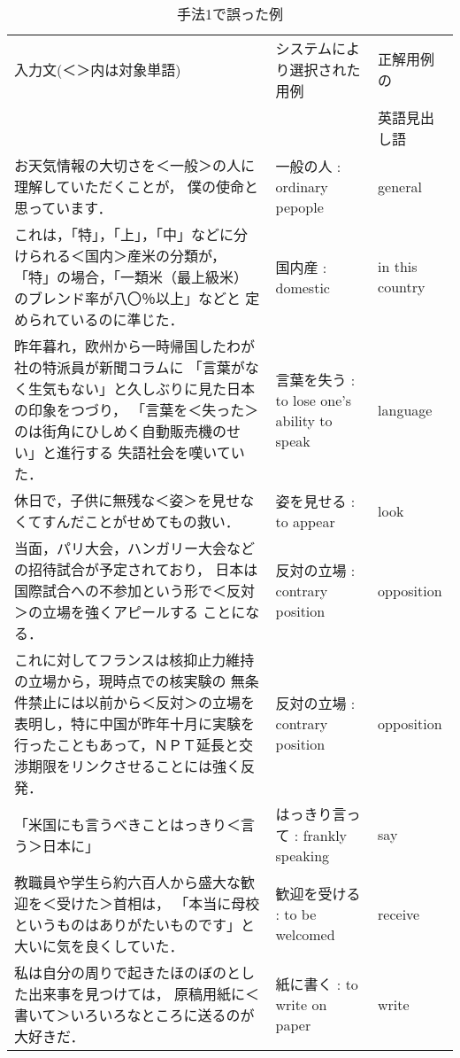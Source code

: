 \begin{table*}[htbp]
  \footnotesize
  \begin{center}
    \caption{手法1で誤った例}
    \label{tab:error1}
    \begin{tabular}[c]{|p{4.5cm}|l|l|}
      \hline
      入力文(＜＞内は対象単語) & システムにより選択された用例 & 正解用例の \\
      & & 英語見出し語 \\
      \hline
      お天気情報の大切さを＜一般＞の人に理解していただくことが，
      僕の使命と思っています． 
      & 一般の人 : ordinary pepople & general \\
      \hline
      これは，「特」，「上」，「中」などに分けられる＜国内＞産米の分類が，
      「特」の場合，「一類米（最上級米）のブレンド率が八〇％以上」などと
      定められているのに準じた．
      & 国内産 : domestic & in this country\\
      \hline
      昨年暮れ，欧州から一時帰国したわが社の特派員が新聞コラムに
      「言葉がなく生気もない」と久しぶりに見た日本の印象をつづり，
      「言葉を＜失った＞のは街角にひしめく自動販売機のせい」と進行する
      失語社会を嘆いていた．
      & 言葉を失う : to lose one's ability to speak & language \\
      \hline
      休日で，子供に無残な＜姿＞を見せなくてすんだことがせめてもの救い．
      & 姿を見せる : to appear & look \\
      \hline
      当面，パリ大会，ハンガリー大会などの招待試合が予定されており，
      日本は国際試合への不参加という形で＜反対＞の立場を強くアピールする
      ことになる．
      & 反対の立場 : contrary position & opposition \\
      \hline
      これに対してフランスは核抑止力維持の立場から，現時点での核実験の
      無条件禁止には以前から＜反対＞の立場を表明し，特に中国が昨年十月に実験を
      行ったこともあって，ＮＰＴ延長と交渉期限をリンクさせることには強く反発．
      & 反対の立場 : contrary position & opposition \\
      \hline
      「米国にも言うべきことはっきり＜言う＞日本に」
      & はっきり言って : frankly speaking & say \\
      \hline
      教職員や学生ら約六百人から盛大な歓迎を＜受けた＞首相は，
      「本当に母校というものはありがたいものです」と大いに気を良くしていた．
      & 歓迎を受ける : to be welcomed & receive \\
      \hline
      私は自分の周りで起きたほのぼのとした出来事を見つけては，
      原稿用紙に＜書いて＞いろいろなところに送るのが大好きだ．
      & 紙に書く : to write on paper & write \\
      \hline
    \end{tabular}
  \end{center}
\end{table*}

